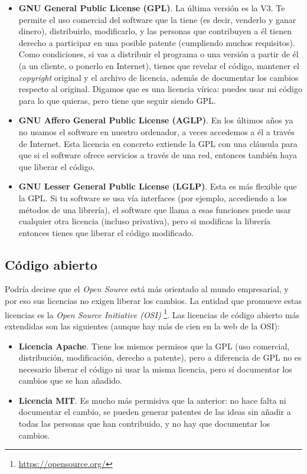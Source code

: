\begin{itemize}

\item \textbf{GNU General Public License (GPL)}. La última versión es la V3. Te permite el uso comercial del software que la tiene (es decir, venderlo y ganar dinero), distribuirlo, modificarlo, y las personas que contribuyen a él tienen derecho a participar en una posible patente (cumpliendo muchos requisitos). Como condiciones, si vas a distribuir el programa o una versión a partir de él (a un cliente, o ponerlo en Internet), tienes que revelar el código, mantener el \textit{copyright} original y el archivo de licencia, además de documentar los cambios respecto al original. Digamos que es una licencia vírica: puedes usar mi código para lo que quieras, pero tiene que seguir siendo GPL.

\item \textbf{GNU Affero General Public License (AGLP)}. En los últimos años ya no usamos el software en nuestro ordenador, a veces accedemos a él a través de Internet. Esta licencia en concreto extiende la GPL con una cláusula para que si el software ofrece servicios a través de una red, entonces también haya que liberar el código.

\item \textbf{GNU Lesser General Public License (LGLP)}. Esta es más flexible que la GPL. Si tu software se usa vía interfaces (por ejemplo, accediendo a los métodos de una librería), el software que llama a esas funciones puede usar cualquier otra licencia (incluso privativa), pero si modificas la librería entonces tienes que liberar el código modificado.

\end{itemize}

\subsection{Código abierto}
Podría decirse que el \textit{Open Source} está más orientado al mundo empresarial, y por eso sus licencias no exigen liberar los cambios. La entidad que promueve estas licencias es la \textit{Open Source Initiative (OSI)} \footnote{\url{https://opensource.org/}}. Las licencias de código abierto más extendidas son las siguientes (aunque hay más de cien en la web de la OSI):

\begin{itemize}
   
\item \textbf{Licencia Apache}. Tiene los mismos permisos que la GPL (uso comercial, distribución, modificación, derecho a patente), pero a diferencia de GPL no es necesario liberar el código ni usar la misma licencia, pero sí documentar los cambios que se han añadido.

\item \textbf{Licencia MIT}. Es mucho más permisiva que la anterior: no hace falta ni documentar el cambio, se pueden generar patentes de las ideas sin añadir a todas las personas que han contribuido, y no hay que documentar los cambios.

\end{itemize}


